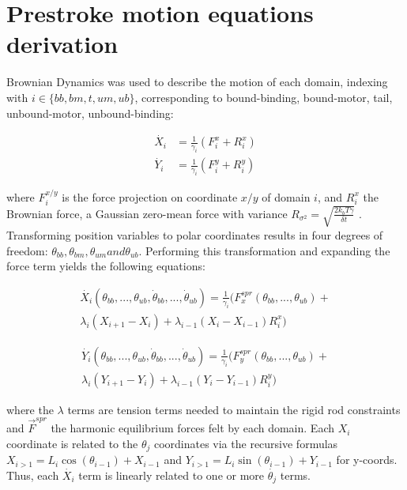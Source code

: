 \documentclass[9pt,twocolumn,twoside]{article}
\begin{document}
\section*{Prestroke motion equations derivation}
Brownian Dynamics was used to describe the motion of each domain, indexing with $i \in \{bb, bm, t, um, ub\}$, corresponding to bound-binding, bound-motor, tail, unbound-motor, unbound-binding:

  \begin{align}
    \dot{X_i} &= \frac{1}{\gamma_i}\left(F^x_i + R^x_i\right)\\
    \dot{Y_i} &= \frac{1}{\gamma_i}\left(F^y_i + R^y_i\right)
  \end{align}

  where $F^{x/y}_i$ is the force projection on coordinate $x/y$ of domain $i$, and $R^x_i$ the Brownian force, a Gaussian zero-mean force with variance $R_{\sigma^2} = \sqrt{\frac{2k_bT\gamma}{\delta t}}$ \cite{einstein}. Transforming position variables to polar coordinates results in four degrees of freedom: $\theta_{bb}, \theta_{bm}, \theta_{um} and \theta_{ub}$. Performing this transformation and expanding the force term yields the following equations:

  \begin{multline}
    \dot{X_i}\left(\theta_{bb}, ..., \theta_{ub}, \dot{\theta}_{bb}, ..., \dot{\theta}_{ub}\right) = \frac{1}{\gamma_i}\big(F^{spr}_x(\theta_{bb}, ..., \theta_{ub}) + \\
    \lambda_i\left(X_{i+1}-X_i\right) + \lambda_{i-1}\left(X_i-X_{i-1}\right)R^x_i\big)
    \label{eq:ob-system}
  \end{multline}

  \begin{multline}
    \dot{Y_i}\left(\theta_{bb}, ..., \theta_{ub}, \dot{\theta}_{bb}, ..., \dot{\theta}_{ub}\right) = \frac{1}{\gamma_i}\big(F^{spr}_y(\theta_{bb}, ..., \theta_{ub}) + \\
    \lambda_i\left(Y_{i+1}-Y_i\right) + \lambda_{i-1}\left(Y_i-Y_{i-1}\right)R^y_i\big)
    \label{eq:ob-system-other}
  \end{multline}

  where the $\lambda$ terms are tension terms needed to maintain the rigid rod constraints and $\vec{F}^{spr}$ the harmonic equilibrium forces felt by each domain. Each $X_i$ coordinate is related to the $\theta_j$ coordinates via the recursive formulas $X_{i>1} = L_i\cos(\theta_{i-1})+X_{i-1}$ and $Y_{i>1} = L_i\sin(\theta_{i-1})+Y_{i-1}$ for y-coords. Thus, each $\dot{X_i}$ term is linearly related to one or more $\dot{\theta_j}$ terms.
\end{document}
